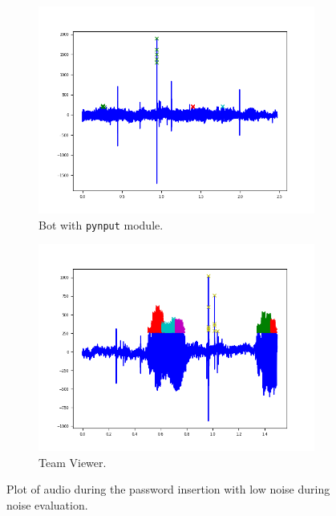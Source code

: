\begin{figure}[h]
     \centering
	 \begin{subfigure}[b]{0.48\textwidth}
         \centering
         \includegraphics[width=\linewidth]{Images/Results/Bot/noise}
         \caption{\footnotesize{Bot with \texttt{pynput} module.}}
     \end{subfigure}
	 \hfill     
     \begin{subfigure}[b]{0.48\textwidth}
         \centering
         \includegraphics[width=\linewidth]{Images/Results/TeamViewer/noise}
         \caption{\footnotesize{Team Viewer.}}
     \end{subfigure}
     \caption{\footnotesize{Plot of audio during the password insertion with low noise during noise evaluation.}}\label{Results:noise_img}
\end{figure}

